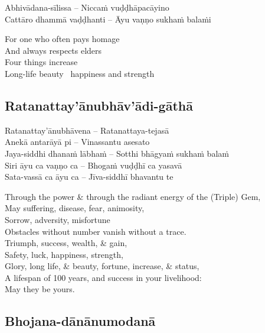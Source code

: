 \begin{twochants}
  Abhivādana-sīlissa – Niccaṁ vuḍḍhāpacāyino\\
  Cattāro dhammā vaḍḍhanti – Āyu vaṇṇo sukhaṁ balaṁi
\end{twochants}

\begin{english}
  For one who often pays homage\\
  And always respects elders\\
  Four things increase\\
  Long-life beauty \breathmark\ happiness and strength
\end{english}

\suttaRef{[Dhp 109]}

\subsection{Ratanattay'ānubhāv'ādi-gāthā}
\label{ratanattayanubhavadi-gatha}

Ratanattay'ānubhāvena – Ratanattaya-tejasā\\
Anekā antarāyā pi – Vinassantu asesato\\
Jaya-siddhi dhanaṁ lābhaṁ – Sotthi bhāgyaṁ sukhaṁ balaṁ\\
Siri āyu ca vaṇṇo ca – Bhogaṁ vuḍḍhī ca yasavā\\
Sata-vassā ca āyu ca – Jīva-siddhī bhavantu te

\begin{english}
  Through the power \& through the radiant energy of the (Triple) Gem,\\
  May suffering, disease, fear, animosity,\\
  Sorrow, adversity, misfortune\\
  Obstacles without number vanish without a trace.\\
  Triumph, success, wealth, \& gain,\\
  Safety, luck, happiness, strength,\\
  Glory, long life, \& beauty, fortune, increase, \& status,\\
  A lifespan of 100 years, and success in your livelihood:\\
  May they be yours.
\end{english}

\suttaRef{[Thai]}

\subsection{Bhojana-dānānumodanā}
\label{bhojana-dananumodana}

